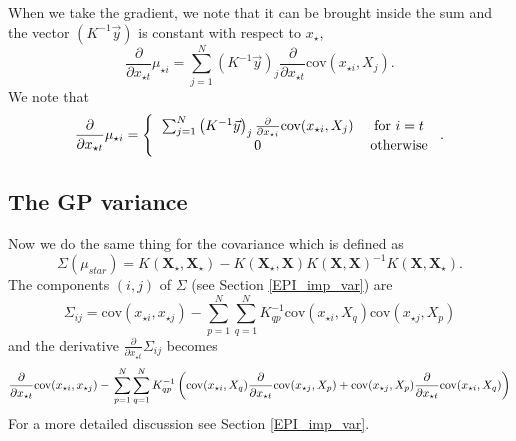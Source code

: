 \documentclass[phd,tocprelim]{cornell}
\begin{document}
When we take the gradient, we note that it can be brought inside the sum and the vector $(K^{-1}\vec{y})$ is constant with respect to $x_{\star}$,
\begin{equation}
 \frac{\partial}{\partial x_{\star t}} \mu_{\star i} = \sum_{j = 1}^{N} \left(K^{-1} \vec{y} \right)_{j} \frac{\partial}{\partial x_{\star t}} \mbox{cov}(x_{\star i}, X_{j}).
\end{equation}
We note that
\begin{equation}
\frac{\partial}{\partial x_{\star t}} \mu_{\star i} = \left\{ \begin{tabular}{cc}
                                                                  $\sum_{j = 1}^{N} \left(K^{-1} \vec{y} \right)_{j} \frac{\partial}{\partial x_{\star i}} \mbox{cov}(x_{\star i}, X_{j})$ & for $i = t$ \\
								  0 & otherwise
                                                                 \end{tabular}\right..
\end{equation}

\subsection{The GP variance}
\label{methods_GP_var}

Now we do the same thing for the covariance which is defined as
\begin{equation}
 \Sigma(\mu_{star}) = K(\textbf{X$_{\star}$}, \textbf{X$_{\star}$}) - K(\textbf{X$_{\star}$}, \textbf{X}) K(\textbf{X}, \textbf{X})^{-1} K(\textbf{X}, \textbf{X$_{\star}$}).
\end{equation}
The components $(i,j)$ of $\Sigma$ (see Section \ref{EPI_imp_var}) are
\begin{equation}
 \Sigma_{ij} = \mbox{cov}(x_{\star i}, x_{\star j}) - \sum_{p = 1}^{N} \sum_{q = 1}^{N} K^{-1}_{qp} \mbox{cov}(x_{\star i}, X_{q}) \mbox{cov}(x_{\star j}, X_{p})
\end{equation}
and the derivative $\frac{\partial}{\partial x_{\star t}} \Sigma_{ij}$ becomes
\begin{equation}
 \frac{\partial}{\partial x_{\star t}} \mbox{cov}(x_{\star i}, x_{\star j}) - \\
 \sum_{p = 1}^{N} \sum_{q = 1}^{N} K^{-1}_{qp} \left( \mbox{cov}(x_{\star i}, X_{q}) \frac{\partial}{\partial x_{\star t}} \mbox{cov}(x_{\star j}, X_{p}) + \mbox{cov}(x_{\star j}, X_{p}) \frac{\partial}{\partial x_{\star t}} \mbox{cov}(x_{\star i}, X_{q}) \right)
\end{equation}
For a more detailed discussion see Section \ref{EPI_imp_var}.
\end{document}
